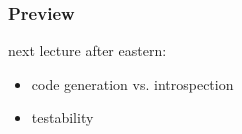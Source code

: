 \begin{frame}
	\frametitle{Preview}
	next lecture after eastern:
	\begin{itemize}
	\item code generation vs. introspection
	\item testability
	\end{itemize}
\end{frame}



\nocite{raab2016improving}

\appendix

\begin{frame}[allowframebreaks]
	
	
\end{frame}




